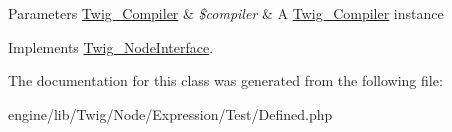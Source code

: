 \begin{DoxyParams}[1]{Parameters}
\hyperlink{class_twig___compiler}{Twig\+\_\+\+Compiler} & {\em \$compiler} & A \hyperlink{class_twig___compiler}{Twig\+\_\+\+Compiler} instance \\
\hline
\end{DoxyParams}


Implements \hyperlink{interface_twig___node_interface_a4e0faa87c3fae583620b84d3607085da}{Twig\+\_\+\+Node\+Interface}.



The documentation for this class was generated from the following file\+:\begin{DoxyCompactItemize}
\item 
engine/lib/\+Twig/\+Node/\+Expression/\+Test/Defined.\+php\end{DoxyCompactItemize}
